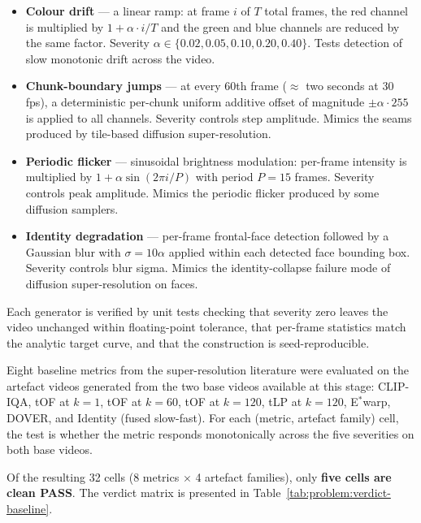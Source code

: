 \begin{itemize}
    \item \textbf{Colour drift} --- a linear ramp: at frame $i$ of $T$ total frames, the
          red channel is multiplied by $1 + \alpha \cdot i / T$ and the green and blue
          channels are reduced by the same factor. Severity $\alpha \in \{0.02, 0.05,
          0.10, 0.20, 0.40\}$. Tests detection of slow monotonic drift across the video.
    \item \textbf{Chunk-boundary jumps} --- at every 60th frame ($\approx$ two seconds at
          30 fps), a deterministic per-chunk uniform additive offset of magnitude
          $\pm\alpha \cdot 255$ is applied to all channels. Severity controls step
          amplitude. Mimics the seams produced by tile-based diffusion super-resolution.
    \item \textbf{Periodic flicker} --- sinusoidal brightness modulation: per-frame
          intensity is multiplied by $1 + \alpha \sin(2\pi i / P)$ with period $P = 15$
          frames. Severity controls peak amplitude. Mimics the periodic flicker produced
          by some diffusion samplers.
    \item \textbf{Identity degradation} --- per-frame frontal-face detection followed by
          a Gaussian blur with $\sigma = 10\alpha$ applied within each detected face
          bounding box. Severity controls blur sigma. Mimics the identity-collapse
          failure mode of diffusion super-resolution on faces.
\end{itemize}

Each generator is verified by unit tests checking that severity zero leaves the video
unchanged within floating-point tolerance, that per-frame statistics match the analytic
target curve, and that the construction is seed-reproducible.

Eight baseline metrics from the super-resolution literature were evaluated on the
artefact videos generated from the two base videos available at this stage: CLIP-IQA,
tOF at $k = 1$, tOF at $k = 60$, tOF at $k = 120$, tLP at $k = 120$, E$^*$warp, DOVER,
and Identity (fused slow-fast). For each (metric, artefact family) cell, the test is
whether the metric responds monotonically across the five severities on both base videos.

Of the resulting 32 cells (8 metrics $\times$ 4 artefact families), only \textbf{five
cells are clean PASS}. The verdict matrix is presented in
Table~\ref{tab:problem:verdict-baseline}.

